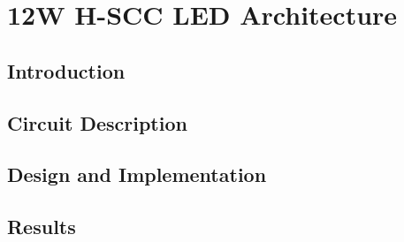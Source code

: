 \chapter{12W H-SCC LED Architecture}
\section{Introduction}
\section{Circuit Description}
\section{Design and Implementation}
\section{Results}


